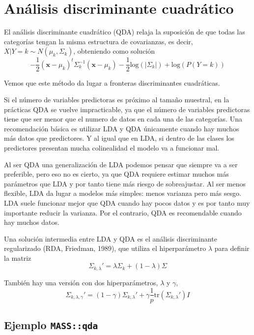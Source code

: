 \documentclass[
]{book}
\theoremstyle{break}
\theoremstyle{definition}
\theoremstyle{definition}
\theoremstyle{definition}
\theoremstyle{definition}
\theoremstyle{remark}
\begin{document}
\hypertarget{anuxe1lisis-discriminante-cuadruxe1tico}{%
\section{Análisis discriminante cuadrático}\label{anuxe1lisis-discriminante-cuadruxe1tico}}

El análisis discriminante cuadrático (QDA) relaja la suposición de que todas las categorías tengan la misma estructura de covarianzas, es decir, \(X | Y = k \sim N(\mu_k, \Sigma_k)\), obteniendo como solución
\[-\frac{1}{2} (\mathbf{x} - \mu_k)^t \Sigma^{-1}_k (\mathbf{x} - \mu_k) - \frac{1}{2} \mbox{log}(|\Sigma_k|) + \mbox{log}(P(Y = k))\]

Vemos que este método da lugar a fronteras discriminantes cuadráticas.

Si el número de variables predictoras es próximo al tamaño muestral, en la prácticas QDA se vuelve impracticable, ya que el número de variables predictoras tiene que ser menor que el numero de datos en cada una de las categorías. Una recomendación básica es utilizar LDA y QDA únicamente cuando hay muchos más datos que predictores. Y al igual que en LDA, si dentro de las clases los predictores presentan mucha colinealidad el modelo va a funcionar mal.

Al ser QDA una generalización de LDA podemos pensar que siempre va a ser preferible, pero eso no es cierto, ya que QDA requiere estimar muchos más parámetros que LDA y por tanto tiene más riesgo de sobreajustar. Al ser menos flexible, LDA da lugar a modelos más simples: menos varianza pero más sesgo. LDA suele funcionar mejor que QDA cuando hay pocos datos y es por tanto muy importante reducir la varianza. Por el contrario, QDA es recomendable cuando hay muchos datos.

Una solución intermedia entre LDA y QDA es el análisis discriminante regularizado (RDA, Friedman, 1989), que utiliza el hiperparámetro \(\lambda\) para definir la matriz
\[\Sigma_{k,\lambda}' = \lambda\Sigma_k + (1 - \lambda) \Sigma
\]

También hay una versión con dos hiperparámetros, \(\lambda\) y \(\gamma\),
\[\Sigma_{k,\lambda,\gamma}' = (1 - \gamma) \Sigma_{k,\lambda}' + \gamma \frac{1}{p} \mbox{tr} (\Sigma_{k,\lambda}')I
\]

\hypertarget{ejemplo-massqda}{%
\subsection{\texorpdfstring{Ejemplo \texttt{MASS::qda}}{Ejemplo MASS::qda}}\label{ejemplo-massqda}}
\end{document}
